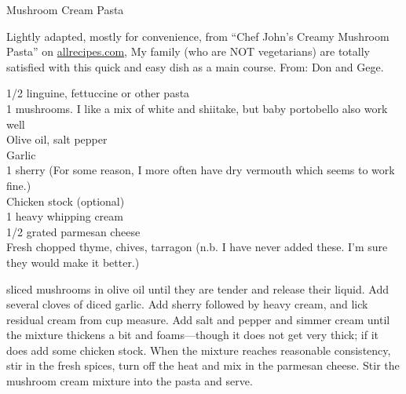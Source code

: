 
\begin{entry}{Mushroom Cream Pasta
}

\begin{open}
    Lightly adapted, mostly for convenience, from ``Chef John's Creamy Mushroom
    Pasta'' on \url{allrecipes.com}, My family (who are NOT vegetarians) are
    totally satisfied with this quick and easy dish as a main course. From: Don
    and Gege.
\end{open}
\begin{ingredients}
    \SI{1/2}{\pound} linguine, fettuccine or other pasta\\
    \SI{1}{\pound} mushrooms. I like a mix of white and shiitake, but baby
    portobello also work well\\
    Olive oil, salt pepper\\
    Garlic\\
    \SI{1}{\tblspoon} sherry (For some reason, I more often have dry vermouth
    which seems to work fine.) \\
    Chicken stock (optional)\\
    \SI{1}{\cup} heavy whipping cream\\
    \SI{1/2}{\cup} grated parmesan cheese\\
    Fresh chopped thyme, chives, tarragon (n.b. I have never added these. I'm
    sure  they would make it better.)
\end{ingredients}
\Saute sliced mushrooms in olive oil until they are tender and release their
liquid. Add several cloves of diced garlic. Add sherry followed by heavy cream,
and lick residual cream from cup measure. Add salt and pepper and simmer cream
until the mixture thickens a bit and foams---though it does not get very thick;
if it does add some chicken stock. When the mixture reaches reasonable
consistency, stir in the fresh spices, turn off the heat and mix in the parmesan
cheese. Stir the mushroom cream mixture into the pasta and serve.
\end{entry}

